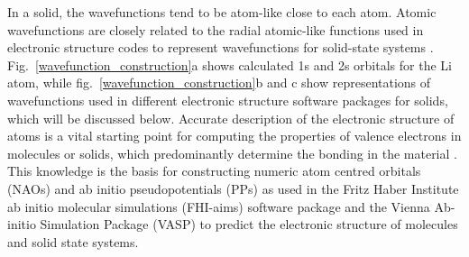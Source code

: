 \documentclass[11pt, twoside]{report}
\begin{document}
In a solid, the wavefunctions tend to be atom-like close to each atom. Atomic wavefunctions are closely related to the radial atomic-like functions used in electronic structure codes to represent wavefunctions for solid-state systems \cite{RichardMartin_Ch10}. 
Fig.~\ref{wavefunction_construction}a shows calculated 1s and 2s orbitals for the Li atom, while fig.~\ref{wavefunction_construction}b and c show representations of wavefunctions used in different electronic structure software packages for solids, which will be discussed below.
Accurate description of the electronic structure of atoms is a vital starting point for computing the properties of valence electrons in molecules or solids, which predominantly determine the bonding in the material \cite{RichardMartin_Ch11}. This knowledge is the basis for constructing numeric atom centred orbitals (NAOs) and ab initio pseudopotentials (PPs) as used in the Fritz Haber Institute ab initio molecular simulations (FHI-aims) \cite{FHI-aims} software package and the Vienna Ab-initio Simulation Package (VASP) \cite{VASP} to predict the electronic structure of molecules and solid state systems.
\end{document}
